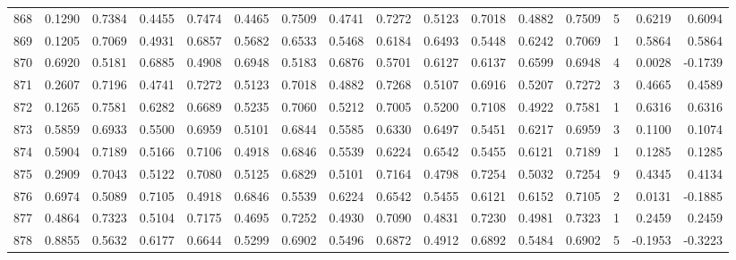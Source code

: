 \begin{tabular}{lrrrrrrrrrrrrrrr}
868 &      0.1290 &  0.7384 &  0.4455 &  0.7474 &  0.4465 &  0.7509 &  0.4741 &  0.7272 &  0.5123 &  0.7018 &   0.4882 &     0.7509 &      5 &                    0.6219 &                     0.6094 \\
869 &      0.1205 &  0.7069 &  0.4931 &  0.6857 &  0.5682 &  0.6533 &  0.5468 &  0.6184 &  0.6493 &  0.5448 &   0.6242 &     0.7069 &      1 &                    0.5864 &                     0.5864 \\
870 &      0.6920 &  0.5181 &  0.6885 &  0.4908 &  0.6948 &  0.5183 &  0.6876 &  0.5701 &  0.6127 &  0.6137 &   0.6599 &     0.6948 &      4 &                    0.0028 &                    -0.1739 \\
871 &      0.2607 &  0.7196 &  0.4741 &  0.7272 &  0.5123 &  0.7018 &  0.4882 &  0.7268 &  0.5107 &  0.6916 &   0.5207 &     0.7272 &      3 &                    0.4665 &                     0.4589 \\
872 &      0.1265 &  0.7581 &  0.6282 &  0.6689 &  0.5235 &  0.7060 &  0.5212 &  0.7005 &  0.5200 &  0.7108 &   0.4922 &     0.7581 &      1 &                    0.6316 &                     0.6316 \\
873 &      0.5859 &  0.6933 &  0.5500 &  0.6959 &  0.5101 &  0.6844 &  0.5585 &  0.6330 &  0.6497 &  0.5451 &   0.6217 &     0.6959 &      3 &                    0.1100 &                     0.1074 \\
874 &      0.5904 &  0.7189 &  0.5166 &  0.7106 &  0.4918 &  0.6846 &  0.5539 &  0.6224 &  0.6542 &  0.5455 &   0.6121 &     0.7189 &      1 &                    0.1285 &                     0.1285 \\
875 &      0.2909 &  0.7043 &  0.5122 &  0.7080 &  0.5125 &  0.6829 &  0.5101 &  0.7164 &  0.4798 &  0.7254 &   0.5032 &     0.7254 &      9 &                    0.4345 &                     0.4134 \\
876 &      0.6974 &  0.5089 &  0.7105 &  0.4918 &  0.6846 &  0.5539 &  0.6224 &  0.6542 &  0.5455 &  0.6121 &   0.6152 &     0.7105 &      2 &                    0.0131 &                    -0.1885 \\
877 &      0.4864 &  0.7323 &  0.5104 &  0.7175 &  0.4695 &  0.7252 &  0.4930 &  0.7090 &  0.4831 &  0.7230 &   0.4981 &     0.7323 &      1 &                    0.2459 &                     0.2459 \\
878 &      0.8855 &  0.5632 &  0.6177 &  0.6644 &  0.5299 &  0.6902 &  0.5496 &  0.6872 &  0.4912 &  0.6892 &   0.5484 &     0.6902 &      5 &                   -0.1953 &                    -0.3223 \\

\end{tabular}
